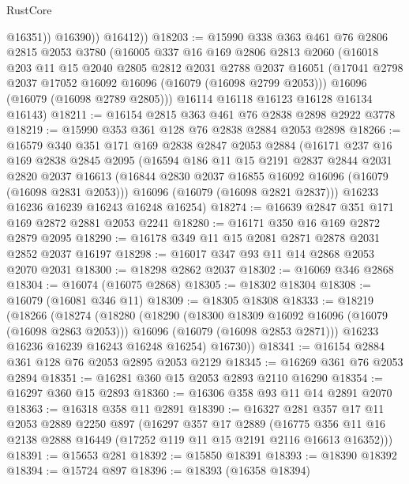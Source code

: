\begin{lexlean}{RustCore}
\begin{coremodule}
                @16351))
            @16390))
        @16412))
@18203 := @15990
    @338
    @363
    @461
    @76
    @2806
    @2815
    @2053
    @3780
    (@16005
      @337
      @16
      @169
      @2806
      @2813
      @2060
      (@16018
        @203
        @11
        @15
        @2040
        @2805
        @2812
        @2031
        @2788
        @2037
        @16051
        (@17041 @2798 @2037 @17052 @16092 @16096 (@16079 (@16098 @2799 @2053)))
        @16096
        (@16079 (@16098 @2789 @2805)))
      @16114
      @16118
      @16123
      @16128
      @16134
      @16143)
@18211 := @16154 @2815 @363 @461 @76 @2838 @2898 @2922 @3778
@18219 := @15990 @353 @361 @128 @76 @2838 @2884 @2053 @2898
@18266 := @16579
    @340
    @351
    @171
    @169
    @2838
    @2847
    @2053
    @2884
    (@16171
      @237
      @16
      @169
      @2838
      @2845
      @2095
      (@16594
        @186
        @11
        @15
        @2191
        @2837
        @2844
        @2031
        @2820
        @2037
        @16613
        (@16844 @2830 @2037 @16855 @16092 @16096 (@16079 (@16098 @2831 @2053)))
        @16096
        (@16079 (@16098 @2821 @2837)))
      @16233
      @16236
      @16239
      @16243
      @16248
      @16254)
@18274 := @16639 @2847 @351 @171 @169 @2872 @2881 @2053 @2241
@18280 := @16171 @350 @16 @169 @2872 @2879 @2095
@18290 := @16178 @349 @11 @15 @2081 @2871 @2878 @2031 @2852 @2037 @16197
@18298 := @16017 @347 @93 @11 @14 @2868 @2053 @2070 @2031
@18300 := @18298 @2862 @2037
@18302 := @16069 @346 @2868
@18304 := @16074 (@16075 @2868)
@18305 := @18302 @18304
@18308 := @16079 (@16081 @346 @11)
@18309 := @18305 @18308
@18333 := @18219
    (@18266
      (@18274
        (@18280
          (@18290
            (@18300 @18309 @16092 @16096 (@16079 (@16098 @2863 @2053)))
            @16096
            (@16079 (@16098 @2853 @2871)))
          @16233
          @16236
          @16239
          @16243
          @16248
          @16254)
        @16730))
@18341 := @16154 @2884 @361 @128 @76 @2053 @2895 @2053 @2129
@18345 := @16269 @361 @76 @2053 @2894
@18351 := @16281 @360 @15 @2053 @2893 @2110 @16290
@18354 := @16297 @360 @15 @2893
@18360 := @16306 @358 @93 @11 @14 @2891 @2070
@18363 := @16318 @358 @11 @2891
@18390 := @16327
    @281
    @357
    @17
    @11
    @2053
    @2889
    @2250
    @897
    (@16297
      @357
      @17
      @2889
      (@16775 @356 @11 @16 @2138 @2888 @16449 (@17252 @119 @11 @15 @2191 @2116 @16613 @16352)))
@18391 := @15653 @281
@18392 := @15850 @18391
@18393 := @18390 @18392
@18394 := @15724 @897
@18396 := @18393 (@16358 @18394)

\end{coremodule}
\end{lexlean}
